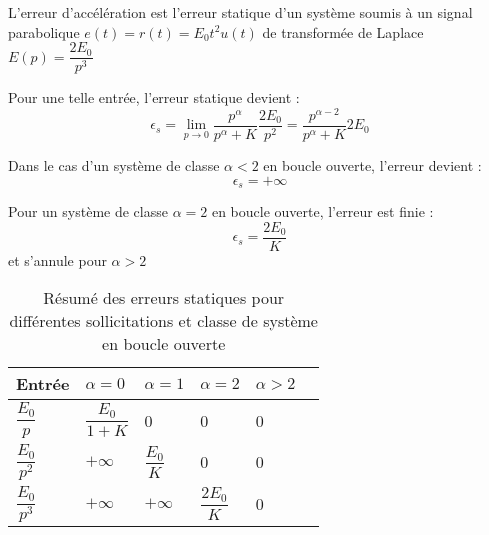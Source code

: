 L'erreur d'accélération est l'erreur statique d'un système soumis à un signal
parabolique $e(t)=r(t)=E_0t^2 u(t)$ de transformée de Laplace $E(p)=\dfrac{2E_0}{p^3}$

Pour une telle entrée, l'erreur statique devient :
$$
\epsilon_s=\lim\limits_{p\to 0} \dfrac{p^\alpha}{p^\alpha+K}\dfrac{2E_0}{p^2}=\dfrac{p^{\alpha-2}}{p^\alpha+K}2E_0 
$$

Dans le cas d'un système de classe $\alpha<2$ en boucle ouverte, l'erreur devient :
$$
\epsilon_s=+\infty
$$

Pour un système de classe $\alpha=2$ en boucle ouverte, l'erreur est finie :
$$
\epsilon_s=\dfrac{2E_0}{K}
$$
et s'annule pour $\alpha>2$

\begin{table}
	\centering
\begin{tabular}{M{2cm}M{2cm}M{2cm}M{2cm}M{2cm}N}
	\hline
	Entrée & $\alpha=0$ & $\alpha=1$ & $\alpha=2$ & $\alpha>2$ & \\[2em]
	\hline
	$\dfrac{E_0}{p}$   &  $\dfrac{E_0}{1+K}$ & 0                & 0                 & 0 & \\[2em]
	$\dfrac{E_0}{p^2}$ &  $+\infty$          & $\dfrac{E_0}{K}$ & 0                 & 0 & \\[2em]
	$\dfrac{E_0}{p^3}$ &  $+\infty$          & $+\infty$        & $\dfrac{2E_0}{K}$ & 0 & \\[2em]
	\hline
\end{tabular}
	\caption{Résumé des erreurs statiques pour différentes sollicitations et 
	classe de système en boucle ouverte}
\end{table}







